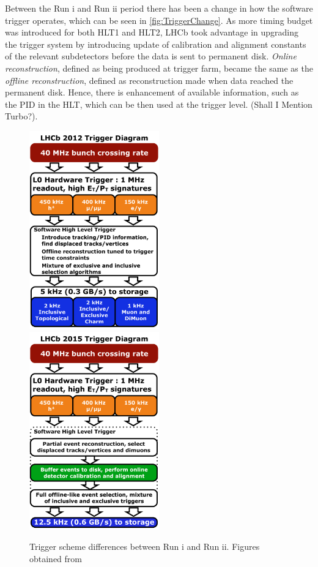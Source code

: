 Between the Run \Rn{1} and Run \Rn{2} period there has been a change in how the software trigger operates, which can be seen in \autoref{fig:TriggerChange}. As more timing budget was introduced for both \Gls{HLT1} and \Gls{HLT2}, \Gls{LHCb} took advantage in upgrading the trigger system by introducing update of calibration and alignment constants of the relevant subdetectors before the data is sent to permanent disk. \textit{Online reconstruction}, defined as being produced at trigger farm, became the same as the \textit{offline reconstruction}, defined as reconstruction made when data reached the permanent disk. Hence, there is enhancement of available information, such as the \Gls{PID} in the \Gls{HLT}, which can be then used at the trigger level. 
(Shall I Mention Turbo?).


\begin{figure}[!h]
	\centering
	\includegraphics[width = 0.5\textwidth]{figs/detector/LHCb_Trigger_RunIAlg.pdf}%
	\includegraphics[width = 0.5\textwidth]{figs/detector/LHCb_Trigger_RunII.pdf}%
	\caption{Trigger scheme differences between Run \Rn{1} and Run \Rn{2}. Figures obtained from \cite{triggerscheme}}  
	\label{fig:TriggerChange}
\end{figure}


